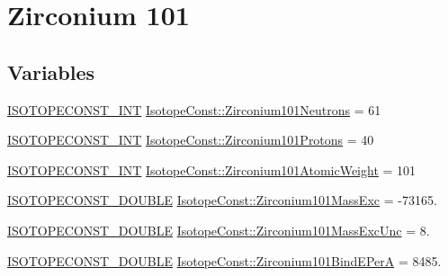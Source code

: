 \hypertarget{group___isotope_const-_zirconium-_zr101}{}\section{Zirconium 101}
\label{group___isotope_const-_zirconium-_zr101}
\subsection*{Variables}
\begin{DoxyCompactItemize}
\item 
\mbox{\hyperlink{group___isotope_const-_macros_ga5f18360b3e99483a35c32d789e62621c}{I\+S\+O\+T\+O\+P\+E\+C\+O\+N\+S\+T\+\_\+\+I\+NT}} \mbox{\hyperlink{group___isotope_const-_zirconium-_zr101_ga1e9a7e47c5d17bdc95e1550c84235f69}{Isotope\+Const\+::\+Zirconium101\+Neutrons}} = 61
\item 
\mbox{\hyperlink{group___isotope_const-_macros_ga5f18360b3e99483a35c32d789e62621c}{I\+S\+O\+T\+O\+P\+E\+C\+O\+N\+S\+T\+\_\+\+I\+NT}} \mbox{\hyperlink{group___isotope_const-_zirconium-_zr101_ga7a268bc4fd996e2684af2f53e23eab0a}{Isotope\+Const\+::\+Zirconium101\+Protons}} = 40
\item 
\mbox{\hyperlink{group___isotope_const-_macros_ga5f18360b3e99483a35c32d789e62621c}{I\+S\+O\+T\+O\+P\+E\+C\+O\+N\+S\+T\+\_\+\+I\+NT}} \mbox{\hyperlink{group___isotope_const-_zirconium-_zr101_ga49f5350ce9ca65b15c14497191d17c54}{Isotope\+Const\+::\+Zirconium101\+Atomic\+Weight}} = 101
\item 
\mbox{\hyperlink{group___isotope_const-_macros_ga8f45a7272ce02c0b4c65c44636ed719a}{I\+S\+O\+T\+O\+P\+E\+C\+O\+N\+S\+T\+\_\+\+D\+O\+U\+B\+LE}} \mbox{\hyperlink{group___isotope_const-_zirconium-_zr101_gab57ebb85ec3b46aa598fca71f58de2d3}{Isotope\+Const\+::\+Zirconium101\+Mass\+Exc}} = -\/73165.
\item 
\mbox{\hyperlink{group___isotope_const-_macros_ga8f45a7272ce02c0b4c65c44636ed719a}{I\+S\+O\+T\+O\+P\+E\+C\+O\+N\+S\+T\+\_\+\+D\+O\+U\+B\+LE}} \mbox{\hyperlink{group___isotope_const-_zirconium-_zr101_ga920ba484a2c423232af3a3e2031c0a91}{Isotope\+Const\+::\+Zirconium101\+Mass\+Exc\+Unc}} = 8.
\item 
\mbox{\hyperlink{group___isotope_const-_macros_ga8f45a7272ce02c0b4c65c44636ed719a}{I\+S\+O\+T\+O\+P\+E\+C\+O\+N\+S\+T\+\_\+\+D\+O\+U\+B\+LE}} \mbox{\hyperlink{group___isotope_const-_zirconium-_zr101_ga258fb9656a70efa66d4f0d09273a2ba3}{Isotope\+Const\+::\+Zirconium101\+Bind\+E\+PerA}} = 8485.
\item 

\end{DoxyCompactItemize}
